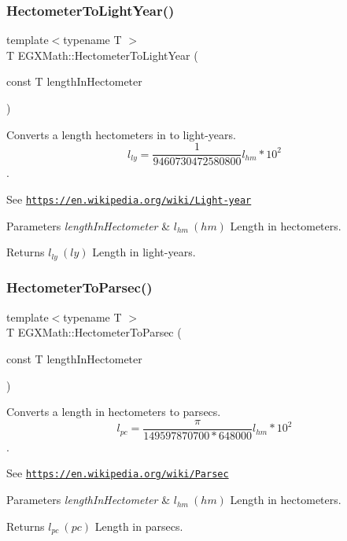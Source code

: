 \subsubsection{\texorpdfstring{Hectometer\+To\+Light\+Year()}{HectometerToLightYear()}}
{\footnotesize\ttfamily template$<$typename T $>$ \\
T E\+G\+X\+Math\+::\+Hectometer\+To\+Light\+Year (\begin{DoxyParamCaption}\item[{const T}]{length\+In\+Hectometer }\end{DoxyParamCaption})}



Converts a length hectometers in to light-\/years. \[ l_{ly}= \frac{1}{9460730472580800} l_{hm} * 10^{2} \]. 

See \href{https://en.wikipedia.org/wiki/Light-year}{\tt https\+://en.\+wikipedia.\+org/wiki/\+Light-\/year} 
\begin{DoxyParams}{Parameters}
{\em length\+In\+Hectometer} & $ l_{hm}\ (hm)$ Length in hectometers. \\
\hline
\end{DoxyParams}
\begin{DoxyReturn}{Returns}
$ l_{ly}\ (ly)$ Length in light-\/years. 
\end{DoxyReturn}
\mbox{\label{group___e_g_x_math-_conversions-_length_conversions-_s_i-_hectometer-_astronomical_gae327abefa3e19b130dfde5d8e1f4a4ab}} 
\subsubsection{\texorpdfstring{Hectometer\+To\+Parsec()}{HectometerToParsec()}}
{\footnotesize\ttfamily template$<$typename T $>$ \\
T E\+G\+X\+Math\+::\+Hectometer\+To\+Parsec (\begin{DoxyParamCaption}\item[{const T}]{length\+In\+Hectometer }\end{DoxyParamCaption})}



Converts a length in hectometers to parsecs. \[ l_{pc}=\frac{\pi}{149597870700 * 648000} l_{hm} * 10^{2} \]. 

See \href{https://en.wikipedia.org/wiki/Parsec}{\tt https\+://en.\+wikipedia.\+org/wiki/\+Parsec} 
\begin{DoxyParams}{Parameters}
{\em length\+In\+Hectometer} & $ l_{hm}\ (hm)$ Length in hectometers. \\
\hline
\end{DoxyParams}
\begin{DoxyReturn}{Returns}
$ l_{pc}\ (pc)$ Length in parsecs. 
\end{DoxyReturn}
